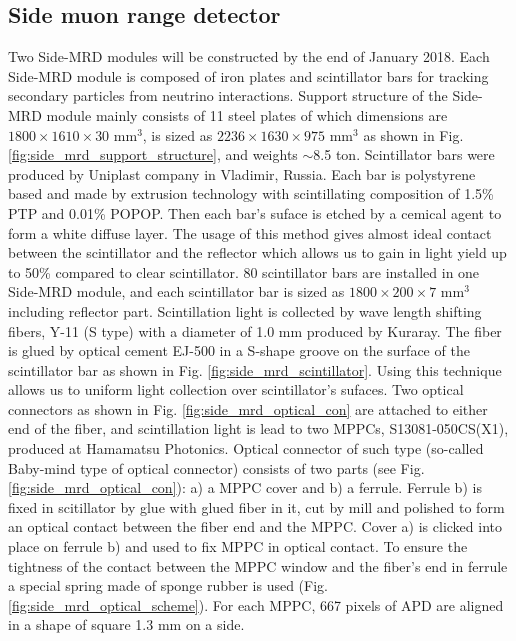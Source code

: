 \subsection{Side muon range detector}
Two Side-MRD modules will be constructed by the end of January 2018. 
Each Side-MRD module is composed of iron plates and scintillator bars for tracking secondary particles from neutrino interactions.
Support structure of the Side-MRD module mainly consists of 11 steel plates of which dimensions are $1800\times1610\times30$ mm$^{3}$, is sized as $2236\times1630\times975$ mm$^{3}$ as shown in Fig. \ref{fig:side_mrd_support_structure}, and weights $\sim$8.5 ton. 
Scintillator bars were produced by Uniplast company in Vladimir, Russia. Each bar is polystyrene based and made by extrusion technology with scintillating composition of 1.5\% PTP and 0.01\% POPOP. Then each bar's suface is etched by a cemical agent to form a white diffuse layer. The usage of this method gives almost ideal contact between the scintillator and the reflector which allows us to gain in light yield up to 50\% compared to clear scintillator. 80 scintillator bars are installed in one Side-MRD module, and each scintillator bar is sized as $1800\times200\times7$ mm$^{3}$ including reflector part. 
Scintillation light is collected by wave length shifting fibers, Y-11 (S type) with a diameter of 1.0 mm produced by Kuraray. 
The fiber is glued by optical cement EJ-500 in a S-shape groove on the surface of the scintillator bar as shown in Fig. \ref{fig:side_mrd_scintillator}. Using this technique allows us to uniform light collection over scintillator's sufaces.
Two optical connectors as shown in Fig. \ref{fig:side_mrd_optical_con} are attached to either end of the fiber, and scintillation light is lead to two MPPCs, S13081-050CS(X1), produced at Hamamatsu Photonics. Optical connector of such type (so-called Baby-mind type of optical connector) consists of two parts (see Fig. \ref{fig:side_mrd_optical_con}): a) a MPPC cover and b) a ferrule. Ferrule b) is fixed in scitillator by glue with glued fiber in it, cut by mill and polished to form an optical contact between the fiber end and the MPPC. Cover a) is clicked into place on ferrule b) and used to fix MPPC in optical contact. To ensure the tightness of the contact between the MPPC window and the fiber's end in ferrule a special spring made of sponge rubber is used (Fig. \ref{fig:side_mrd_optical_scheme}). 
For each MPPC, 667 pixels of APD are aligned in a shape of square 1.3 mm on a side. 

